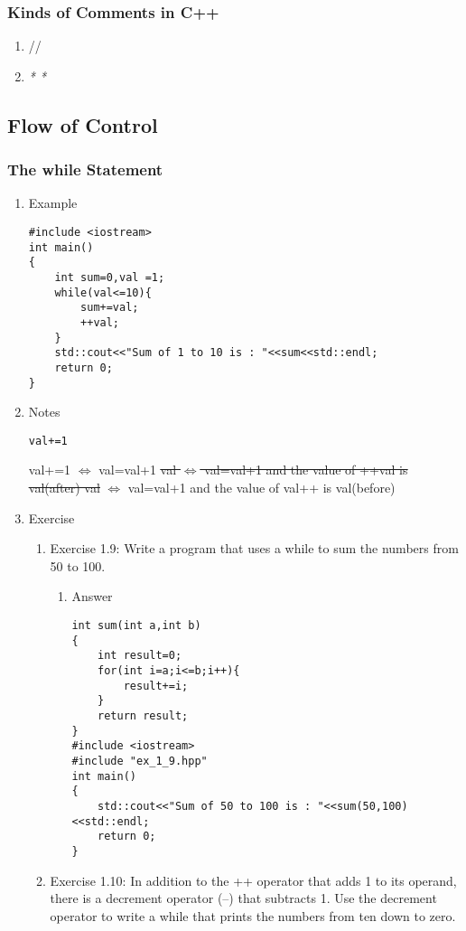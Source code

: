 \documentclass[11pt]{article}
\begin{document}
\subsubsection{Kinds of Comments in C++}
\label{sec-1-3-1}
\begin{enumerate}
\item //
\item \emph{*    *}
\end{enumerate}
\subsection{Flow of Control}
\label{sec-1-4}
\subsubsection{The while Statement}
\label{sec-1-4-1}
\begin{enumerate}
\item Example
\label{sec-1-4-1-1}
\begin{verbatim}
#include <iostream>
int main()
{
    int sum=0,val =1;
    while(val<=10){
        sum+=val;
        ++val;
    }
    std::cout<<"Sum of 1 to 10 is : "<<sum<<std::endl;
    return 0;
}
\end{verbatim}
\item Notes
\label{sec-1-4-1-2}
\begin{verbatim}
val+=1
\end{verbatim}
val+=1 $\Leftrightarrow$  val=val+1
\sout{\sout{val  $\Leftrightarrow$  val=val+1 and the value of ++val is val(after)
val}}  $\Leftrightarrow$  val=val+1 and the value of val++ is val(before)
\item Exercise
\label{sec-1-4-1-3}
\begin{enumerate}
\item Exercise 1.9: Write a program that uses a while to sum the numbers from 50 to 100.
\label{sec-1-4-1-3-1}
\begin{enumerate}
\item Answer
\label{sec-1-4-1-3-1-1}
\begin{verbatim}
int sum(int a,int b)
{
    int result=0;
    for(int i=a;i<=b;i++){
        result+=i;
    }
    return result;
}
#include <iostream>
#include "ex_1_9.hpp"
int main()
{
    std::cout<<"Sum of 50 to 100 is : "<<sum(50,100)<<std::endl;
    return 0;
}
\end{verbatim}
\end{enumerate}
\item Exercise 1.10: In addition to the ++ operator that adds 1 to its operand, there is a decrement operator (--) that subtracts 1. Use the decrement operator to write a while that prints the numbers from ten down to zero.

\end{enumerate}
\end{enumerate}
\end{document}

